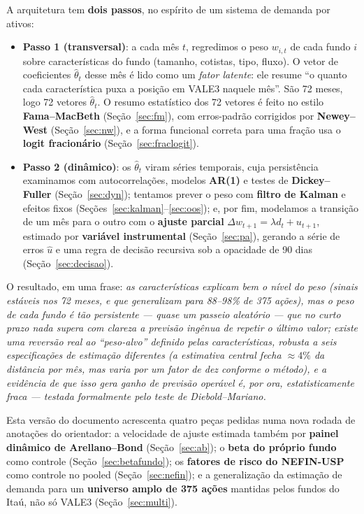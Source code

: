 \documentclass[11pt,a4paper]{article}
\begin{document}
A arquitetura tem \textbf{dois passos}, no espírito de um sistema de demanda por ativos:

\begin{itemize}[topsep=2pt,itemsep=1pt]
\item \textbf{Passo 1 (transversal)}: a cada mês $t$, regredimos o peso $w_{i,t}$ de cada fundo
$i$ sobre características do fundo (tamanho, cotistas, tipo, fluxo). O vetor de coeficientes
$\widehat\theta_t$ desse mês é lido como um \emph{fator latente}: ele resume ``o quanto cada
característica puxa a posição em VALE3 naquele mês''. São 72 meses, logo 72 vetores
$\widehat\theta_t$. O resumo estatístico dos 72 vetores é feito no estilo \textbf{Fama--MacBeth}
(Seção~\ref{sec:fm}), com erros-padrão corrigidos por \textbf{Newey--West}
(Seção~\ref{sec:nw}), e a forma funcional correta para uma fração usa o \textbf{logit
fracionário} (Seção~\ref{sec:fraclogit}).
\item \textbf{Passo 2 (dinâmico)}: os $\widehat\theta_t$ viram séries temporais, cuja persistência
examinamos com autocorrelações, modelos \textbf{AR(1)} e testes de \textbf{Dickey--Fuller}
(Seção~\ref{sec:dyn}); tentamos prever o peso com \textbf{filtro de Kalman} e efeitos fixos
(Seções~\ref{sec:kalman}--\ref{sec:oos}); e, por fim, modelamos a transição de um mês para o
outro com o \textbf{ajuste parcial} $\Delta w_{t+1}=\lambda d_t + u_{t+1}$, estimado por
\textbf{variável instrumental} (Seção~\ref{sec:pa}), gerando a série de erros $\widehat u$ e uma
regra de decisão recursiva sob a opacidade de 90 dias (Seção~\ref{sec:decisao}).
\end{itemize}

O resultado, em uma frase: \emph{as características explicam bem o nível do peso (sinais estáveis
nos 72 meses, e que generalizam para 88--98\% de 375 ações), mas o peso de cada fundo é tão
persistente --- quase um passeio aleatório --- que no curto prazo nada supera com clareza a
previsão ingênua de repetir o último valor; existe uma reversão real ao ``peso-alvo'' definido
pelas características, robusta a seis especificações de estimação diferentes (a estimativa
central fecha $\approx4\%$ da distância por mês, mas varia por um fator de dez conforme o
método), e a evidência de que isso gera ganho de previsão \emph{operável} é, por ora,
estatisticamente fraca --- testada formalmente pelo teste de Diebold--Mariano.}

Esta versão do documento acrescenta quatro peças pedidas numa nova rodada de anotações do
orientador: a velocidade de ajuste estimada também por \textbf{painel dinâmico de Arellano--Bond}
(Seção~\ref{sec:ab}); o \textbf{beta do próprio fundo} como controle (Seção~\ref{sec:betafundo});
os \textbf{fatores de risco do NEFIN-USP} como controle no pooled (Seção~\ref{sec:nefin}); e a
generalização da estimação de demanda para um \textbf{universo amplo de 375 ações}
mantidas pelos fundos do Itaú, não só VALE3 (Seção~\ref{sec:multi}).
\end{document}
